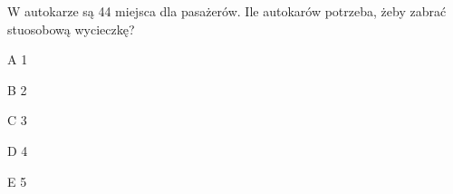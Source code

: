 \begin{tresc}
W autokarze są 44 miejsca dla pasażerów. Ile autokarów potrzeba, żeby zabrać stuosobową wycieczkę?
\end{tresc}
\begin{wariant}{A} 1 \end{wariant}
\begin{wariant}{B} 2 \end{wariant}
\begin{wariant}{C} 3 \end{wariant}
\begin{wariant}{D} 4 \end{wariant}
\begin{wariant}{E} 5 \end{wariant}
